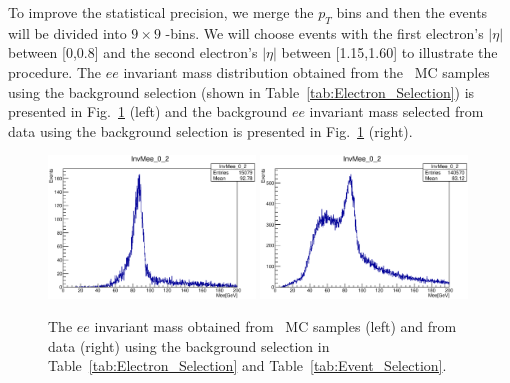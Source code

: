 To improve the statistical precision, we merge the $p_T$ bins and then
the events will be divided into $9\times 9$ \eta-bins. We will choose
events with the first electron's $|\eta|$ between [0,0.8] and the
second electron's $|\eta|$ between [1.15,1.60] to illustrate the
procedure. The $ee$ invariant mass distribution obtained from the
\Zee\ MC samples using the background selection (shown in
Table~\ref{tab:Electron_Selection}) is presented in
Fig.~\ref{fig:Mee} (left) and the background $ee$ invariant mass
selected from data using the background selection is presented in
Fig.~\ref{fig:Mee} (right).
 
\begin{figure}[htbp] 
  \centering
  \includegraphics[width=0.49\textwidth]{figures/ChargeMisID/MergeEt_Ntot_ZeeBkg02.eps}
  \includegraphics[width=0.49\textwidth]{figures/ChargeMisID/MergeEt_Ntot_Bkg02.eps}
  \caption{The $ee$ invariant mass obtained from \Zee\ MC samples
    (left) and from data (right) using the background selection in
    Table~\ref{tab:Electron_Selection} and
    Table~\ref{tab:Event_Selection}.}
  \label{fig:Mee}
\end{figure}

